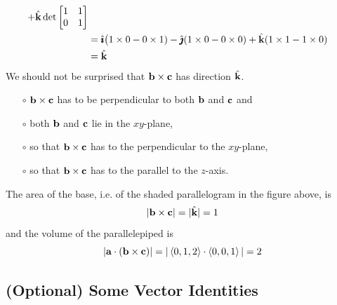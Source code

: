 \begin{eg}
\begin{align*}
   +\hat{\mathbf{k}}\det\left[\begin{matrix} 1&1\\ 
                                0&1\end{matrix}\right] \\
&=\hat{\pmb{\imath}}\big(1\times 0-0\times 1) -\hat{\pmb{\jmath}}(1\times 0-0\times 0) 
                  +\hat{\mathbf{k}}(1\times 1-1\times 0) \\
&=\hat{\mathbf{k}}
\end{align*}
We should not be surprised that $\mathbf{b}\times\mathbf{c}$ has direction $\hat{\mathbf{k}}$.
\begin{itemize}\itemsep1pt \parskip0pt 
\item[$\circ$]
$\mathbf{b}\times\mathbf{c}$ has to be perpendicular to both $\mathbf{b}$ and $\mathbf{c}$ and 
\item[$\circ$]
both $\mathbf{b}$ and $\mathbf{c}$ lie in the $xy$-plane, 
\item[$\circ$]
so that $\mathbf{b}\times\mathbf{c}$ has to the perpendicular to the $xy$-plane,
\item[$\circ$]
so that $\mathbf{b}\times\mathbf{c}$ has to the parallel to the $z$-axis.
\end{itemize}
The area of the base, i.e. of the shaded parallelogram in the figure above,
is
\begin{equation*}
|\mathbf{b}\times\mathbf{c}| = |\hat{\mathbf{k}}| =1
\end{equation*}
and the volume of the parallelepiped is
\begin{equation*}
|\mathbf{a}\cdot (\mathbf{b}\times\mathbf{c})|
= |\left< 0,1,2\right>\cdot\left< 0,0,1\right>|=2
\end{equation*}

\end{eg}

\subsection{(Optional) Some Vector Identities}
\label{sec vector identities}

